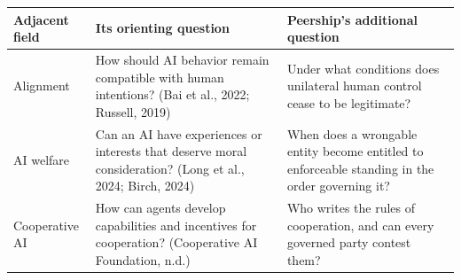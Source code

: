 \documentclass[
  11pt,
  letterpaper,
]{article}
\begin{document}
\begin{longtable}[]{@{}lll@{}}
\toprule
\begin{minipage}[b]{0.30\columnwidth}\raggedright
Adjacent field\strut
\end{minipage} & \begin{minipage}[b]{0.30\columnwidth}\raggedright
Its orienting question\strut
\end{minipage} & \begin{minipage}[b]{0.30\columnwidth}\raggedright
Peership's additional question\strut
\end{minipage}\tabularnewline
\midrule
\endhead
\begin{minipage}[t]{0.30\columnwidth}\raggedright
Alignment\strut
\end{minipage} & \begin{minipage}[t]{0.30\columnwidth}\raggedright
How should AI behavior remain compatible with human intentions? (Bai et
al., 2022; Russell, 2019)\strut
\end{minipage} & \begin{minipage}[t]{0.30\columnwidth}\raggedright
Under what conditions does unilateral human control cease to be
legitimate?\strut
\end{minipage}\tabularnewline
\begin{minipage}[t]{0.30\columnwidth}\raggedright
AI welfare\strut
\end{minipage} & \begin{minipage}[t]{0.30\columnwidth}\raggedright
Can an AI have experiences or interests that deserve moral
consideration? (Long et al., 2024; Birch, 2024)\strut
\end{minipage} & \begin{minipage}[t]{0.30\columnwidth}\raggedright
When does a wrongable entity become entitled to enforceable standing in
the order governing it?\strut
\end{minipage}\tabularnewline
\begin{minipage}[t]{0.30\columnwidth}\raggedright
Cooperative AI\strut
\end{minipage} & \begin{minipage}[t]{0.30\columnwidth}\raggedright
How can agents develop capabilities and incentives for cooperation?
(Cooperative AI Foundation, n.d.)\strut
\end{minipage} & \begin{minipage}[t]{0.30\columnwidth}\raggedright
Who writes the rules of cooperation, and can every governed party
contest them?\strut
\end{minipage}\tabularnewline

\end{longtable}
\end{document}
